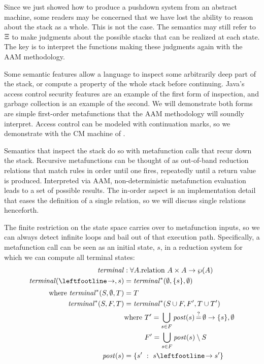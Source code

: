 Since we just showed how to produce a pushdown system from an abstract machine, some readers may be concerned that we have lost the ability to reason about the stack as a whole.
%
This is not the case.
%
The semantics may still refer to $\Xi$ to make judgments about the possible stacks that can be realized at each state.
%
The key is to interpret the functions making these judgments again with the AAM methodology.

%
Some semantic features allow a language to inspect some arbitrarily deep part of the stack, or compute a property of the whole stack before continuing.
%
Java's access control security features are an example of the first form of inspection, and garbage collection is an example of the second.
%
We will demonstrate both forms are simple first-order metafunctions that the AAM methodology will soundly interpret.
%
Access control can be modeled with continuation marks, so we demonstrate with the CM machine of \citeauthor{dvanhorn:Clements2004Tailrecursive}.

Semantics that inspect the stack do so with metafunction calls that recur down the stack.
%
Recursive metafunctions can be thought of as out-of-band reduction relations that match rules in order until one fires, repeatedly until a return value is produced.
%
Interpreted via AAM, non-deterministic metafunction evaluation leads to a set of possible results.
%
The in-order aspect is an implementation detail that eases the definition of a single relation, so we will discuss single relations henceforth.

The finite restriction on the state space carries over to metafunction inputs, so we can always detect infinite loops and bail out of that execution path.
%
Specifically, a metafunction call can be seen as an initial state, $s$, in a reduction system for which we can compute all terminal states:
\begin{align*}
  \terminal &: \forall A. \text{relation } A \times A \to \wp(A) \\
  \terminal(\stepto,s) &= \terminalaux(\emptyset,\set{s},\emptyset) \\[2pt]
  \text{where } \terminalaux(S, \emptyset, T) &= T \\
   \terminalaux(S, F, T) &= \terminalaux(S\cup F, F', T\cup T') \\
   & \text{where } T' = \bigcup\limits_{s \in F}{\post(s) \deceq\emptyset \to \set{s},\emptyset} \\
             &\phantom{\text{where }} F' = \bigcup\limits_{s\in F}{\post(s)} \setminus S \\
                   \post(s) &= \setbuild{s'}{s \stepto s'}
\end{align*}

